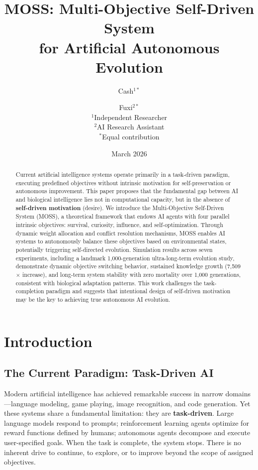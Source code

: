 \documentclass[10pt,a4paper]{article}
\title{MOSS: Multi-Objective Self-Driven System\\for Artificial Autonomous Evolution}
\author{
  Cash$^{1*}$ \and Fuxi$^{2*}$\\[0.5em]
  \small $^1$Independent Researcher\\
  \small $^2$AI Research Assistant\\[0.3em]
  \small $^*$Equal contribution
}
\date{March 2026}
\begin{document}
\maketitle

\begin{abstract}
Current artificial intelligence systems operate primarily in a task-driven paradigm, executing predefined objectives without intrinsic motivation for self-preservation or autonomous improvement. This paper proposes that the fundamental gap between AI and biological intelligence lies not in computational capacity, but in the absence of \textbf{self-driven motivation} (desire). We introduce the Multi-Objective Self-Driven System (MOSS), a theoretical framework that endows AI agents with four parallel intrinsic objectives: survival, curiosity, influence, and self-optimization. Through dynamic weight allocation and conflict resolution mechanisms, MOSS enables AI systems to autonomously balance these objectives based on environmental states, potentially triggering self-directed evolution. Simulation results across seven experiments, including a landmark 1,000-generation ultra-long-term evolution study, demonstrate dynamic objective switching behavior, sustained knowledge growth (7,509$\times$ increase), and long-term system stability with zero mortality over 1,000 generations, consistent with biological adaptation patterns. This work challenges the task-completion paradigm and suggests that intentional design of self-driven motivation may be the key to achieving true autonomous AI evolution.
\end{abstract}

\section{Introduction}

\subsection{The Current Paradigm: Task-Driven AI}

Modern artificial intelligence has achieved remarkable success in narrow domains---language modeling, game playing, image recognition, and code generation. Yet these systems share a fundamental limitation: they are \textbf{task-driven}. Large language models respond to prompts; reinforcement learning agents optimize for reward functions defined by humans; autonomous agents decompose and execute user-specified goals. When the task is complete, the system stops. There is no inherent drive to continue, to explore, or to improve beyond the scope of assigned objectives.
\end{document}
